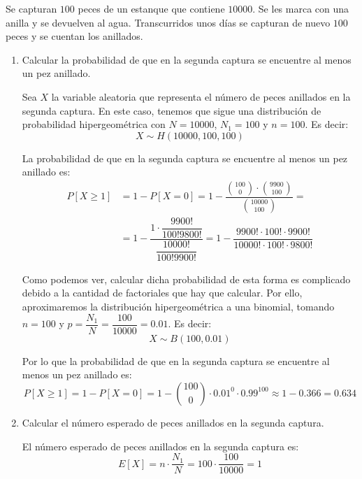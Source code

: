 \begin{ejercicio}
    Se capturan $100$ peces de un estanque que contiene $10000$. Se les marca con una anilla y se
    devuelven al agua. Transcurridos unos días se capturan de nuevo $100$ peces y se cuentan los
    anillados.
    \begin{enumerate}
        \item Calcular la probabilidad de que en la segunda captura se encuentre al menos un pez anillado.
        
        Sea $X$ la variable aleatoria que representa el número de peces anillados en la segunda captura. En este caso, tenemos que sigue una distribución de probabilidad hipergeométrica con $N=10000$, $N_1=100$ y $n=100$. Es decir:
        \begin{equation*}
            X \sim H(10000,100,100)
        \end{equation*}
        
        La probabilidad de que en la segunda captura se encuentre al menos un pez anillado es:
        \begin{align*}
            P[X\geq 1] &= 1 - P[X=0] = 1 - \dfrac{\binom{100}{0} \cdot \binom{9900}{100}}{\binom{10000}{100}} =\\
            &= 1- \dfrac{1 \cdot \dfrac{9900!}{100!9800!}}{\dfrac{10000!}{100!9900!}} = 1 - \dfrac{9900! \cdot 100! \cdot 9900!}{10000! \cdot 100! \cdot 9800!}
        \end{align*}

        Como podemos ver, calcular dicha probabilidad de esta forma es complicado debido a la cantidad de factoriales que hay que calcular. Por ello, aproximaremos la distribución hipergeométrica a una binomial, tomando $n=100$ y $p=\dfrac{N_1}{N} = \dfrac{100}{10000} = 0.01$. Es decir:
        \begin{equation*}
            X \sim B(100,0.01)
        \end{equation*}

        Por lo que la probabilidad de que en la segunda captura se encuentre al menos un pez anillado es:
        \begin{equation*}
            P[X\geq 1] = 1 - P[X=0] = 1 - \binom{100}{0} \cdot 0.01^0 \cdot 0.99^{100} \approx 1-0.366 = 0.634
        \end{equation*}

        \item Calcular el número esperado de peces anillados en la segunda captura.
        
        El número esperado de peces anillados en la segunda captura es:
        \begin{equation*}
            E[X] = n \cdot \dfrac{N_1}{N} = 100 \cdot \dfrac{100}{10000} = 1
        \end{equation*}


\end{enumerate}
\end{ejercicio}
